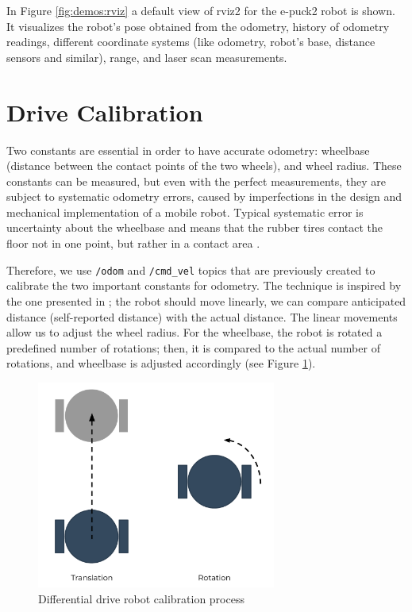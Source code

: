 In Figure \ref{fig:demos:rviz} a default view of \acs{rviz2} for the e-puck2 robot is shown.
It visualizes the robot's pose obtained from the odometry, history of odometry readings, different coordinate systems (like odometry, robot's base, distance sensors and similar), range, and laser scan measurements.

\section{Drive Calibration}

Two constants are essential in order to have accurate odometry: wheelbase (distance between the contact points of the two wheels), and wheel radius.
These constants can be measured, but even with the perfect measurements, they are subject to systematic odometry errors, caused by imperfections in the design and mechanical implementation of a mobile robot.
Typical systematic error is uncertainty about the wheelbase and means that the rubber tires contact the floor not in one point, but rather in a contact area \cite{borenstein_measurement_1996}.

Therefore, we use \texttt{/odom} and \texttt{/cmd\_vel} topics that are previously created to calibrate the two important constants for odometry.
The technique is inspired by the one presented in \cite{borenstein_measurement_1996}; the robot should move linearly, we can compare anticipated distance (self-reported distance) with the actual distance.
The linear movements allow us to adjust the wheel radius.
For the wheelbase, the robot is rotated a predefined number of rotations; then, it is compared to the actual number of rotations, and wheelbase is adjusted accordingly (see Figure \ref{fig:demos:diff_drive_calibration}).

\begin{figure}[H]
    \centering
    \includegraphics[width=0.7\textwidth]{demos/figures/calibration.pdf}
    \caption{Differential drive robot calibration process}
    \label{fig:demos:diff_drive_calibration}
\end{figure}

